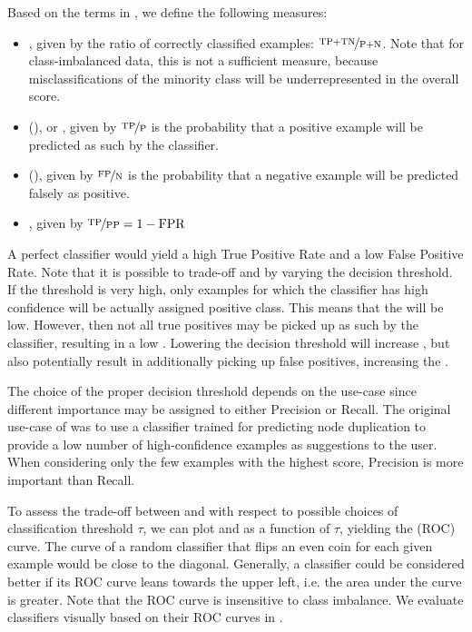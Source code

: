 \documentclass[
	fontsize=10pt, %
	twoside=false, %
	secnumdepth=1, %
  toc=indentunnumbered %
]{kaobook}
\begin{document}
Based on the terms in , we define the following measures:
\begin{itemize}
\item {}, given by the ratio of
  correctly classified examples: $\nicefrac{\TP{} + \TN{}}{\P{}+\N{}}$. Note that for
  class-imbalanced data, this is not a sufficient measure, because
  misclassifications of the minority class will be underrepresented in the
  overall score.
\item  {} (\TPR{}), or , given by $\nicefrac{\TP{}}{\P{}}$ is
  the probability that a positive example will be predicted as such by the classifier.
\item {} (\FPR{}), given by $\nicefrac{\FP{}}{\N{}}$ is the
  probability that a negative example will be predicted falsely as positive.
  \item {}, given by $\nicefrac{\TP{}}{\PP{}} = 1 - \FPR{}$
\end{itemize}

A perfect classifier would yield a high True Positive Rate and a low False
Positive Rate.
%
Note that it is possible to trade-off \FPR{} and \TPR{}
by varying the decision threshold. If the threshold is very high, only examples
for which the classifier has high confidence will be actually assigned positive
class. This means that the \FPR{} will be low. However, then not all true
positives may be picked up as such by the classifier, resulting in a low \TPR{}.
Lowering the decision threshold will increase \TPR{}, but also potentially result
in additionally picking up false positives, increasing the \FPR{}.

The choice of the proper decision threshold
depends on the use-case since different importance may be assigned
to either Precision or Recall.
%
The original use-case of \nielsen{} was to use a classifier trained for predicting
node duplication to provide a low number of high-confidence examples as
suggestions to the user. When considering only the few examples with the highest
score, Precision is more important than Recall.

To assess the trade-off between \FPR{} and \TPR{} with respect to possible
choices of classification threshold $\tau$, we can plot \FPR{} and \TPR{} as a
function of $\tau$, yielding the 
\cite{fawcett_IntroductionROCAnalysis_2006} (ROC) curve. The curve of a random
classifier that flips an even coin for each given example would be close to the
diagonal. 
Generally, a classifier could be considered better if its ROC curve leans
towards the upper left, i.e. the area under the curve is greater.
Note that the ROC curve is insensitive to class imbalance. We evaluate
classifiers visually based on their ROC curves in .
\end{document}

